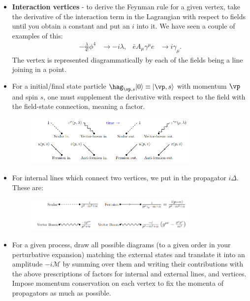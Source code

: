 \documentclass[a4paper, 11pt, normalem]{report}
\begin{document}
\begin{itemize}
    \item \textbf{Interaction vertices} - to derive the Feynman rule for a given vertex, take the derivative of the interaction term in the Lagrangian with respect to fields until you obtain a constant and put an $i$ into it.
        We have seen a couple of examples of this:
        \begin{align}
            -\frac{\lambda}{4!}\phi^4 &\to -i\lambda, & \bar{e}A_\mu\gamma^\mu e &\to i\gamma_\mu.
        \end{align}
        The vertex is represented diagrammatically by each of the fields being a line joining in a point.
    \item For a initial/final state particle $\hag_{\vp,s}|0\rangle \equiv |\vp,s\rangle$ with momentum $\vp$ and spin $s$, one must supplement the derivative with respect to the field with the field-state connection, meaning a factor.
        \begin{figure}[H]
            \centering
            \includegraphics[width=0.8\textwidth]{intfin.png}
        \end{figure}
    \item For internal lines which connect two vertices, we put in the propagator $i\Delta$.
        These are:
        \begin{figure}[H]
            \centering
            \includegraphics[width=0.8\textwidth]{props.png}
        \end{figure}
    \item For a given process, draw all possible diagrams (to a given order in your perturbative expansion) matching the external states and translate it into an amplitude $-i\mathcal{M}$ by summing over them and writing their contributions with the above prescriptions of factors for internal and external lines, and vertices.
        Impose momentum conservation on each vertex to fix the momenta of propagators as much as possible.
\end{itemize}
\end{document}
